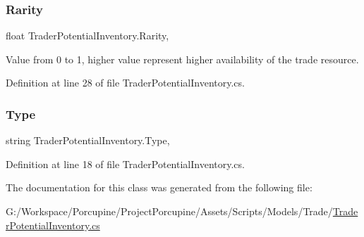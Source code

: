 \subsubsection{\texorpdfstring{Rarity}{Rarity}}
{\footnotesize\ttfamily float Trader\+Potential\+Inventory.\+Rarity\hspace{0.3cm}{\ttfamily [get]}, {\ttfamily [set]}}



Value from 0 to 1, higher value represent higher availability of the trade resource. 



Definition at line 28 of file Trader\+Potential\+Inventory.\+cs.

\mbox{\label{class_trader_potential_inventory_aee63998c8dc738038218ae26d6db2892}} 
\subsubsection{\texorpdfstring{Type}{Type}}
{\footnotesize\ttfamily string Trader\+Potential\+Inventory.\+Type\hspace{0.3cm}{\ttfamily [get]}, {\ttfamily [set]}}



Definition at line 18 of file Trader\+Potential\+Inventory.\+cs.



The documentation for this class was generated from the following file\+:\begin{DoxyCompactItemize}
\item 
G\+:/\+Workspace/\+Porcupine/\+Project\+Porcupine/\+Assets/\+Scripts/\+Models/\+Trade/\hyperlink{_trader_potential_inventory_8cs}{Trader\+Potential\+Inventory.\+cs}\end{DoxyCompactItemize}
